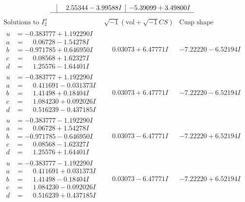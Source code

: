 \documentclass[1p]{elsarticle_modified}
\theoremstyle{definition}
\newcommand{\I}{\sqrt{-1}}
\begin{document}
$$\begin{array}{c|c|c}
 & \phantom{-}2.55344 - 3.99588 I & -5.39099 + 3.49800 I\\
 \hline 
 \end{array}$$\newpage$$\begin{array}{c|c|c}  
\text{Solutions to }I^u_{2}& \I (\text{vol} + \sqrt{-1}CS) & \text{Cusp shape}\\
 \hline 
\begin{aligned}
u &= -0.383777 + 1.192290 I \\
a &= \phantom{-}0.06728 - 1.54278 I \\
b &= -0.971785 + 0.646950 I \\
c &= \phantom{-}0.08568 + 1.62327 I \\
d &= \phantom{-}1.25576 - 1.64401 I\end{aligned}
 & \phantom{-}0.03073 + 6.47771 I & -7.22220 - 6.52194 I \\ \hline\begin{aligned}
u &= -0.383777 + 1.192290 I \\
a &= \phantom{-}0.411691 - 0.031373 I \\
b &= \phantom{-}1.41498 + 0.18404 I \\
c &= \phantom{-}1.084230 + 0.092026 I \\
d &= \phantom{-}0.516239 - 0.437185 I\end{aligned}
 & \phantom{-}0.03073 + 6.47771 I & -7.22220 - 6.52194 I \\ \hline\begin{aligned}
u &= -0.383777 - 1.192290 I \\
a &= \phantom{-}0.06728 + 1.54278 I \\
b &= -0.971785 - 0.646950 I \\
c &= \phantom{-}0.08568 - 1.62327 I \\
d &= \phantom{-}1.25576 + 1.64401 I\end{aligned}
 & \phantom{-}0.03073 - 6.47771 I & -7.22220 + 6.52194 I \\ \hline\begin{aligned}
u &= -0.383777 - 1.192290 I \\
a &= \phantom{-}0.411691 + 0.031373 I \\
b &= \phantom{-}1.41498 - 0.18404 I \\
c &= \phantom{-}1.084230 - 0.092026 I \\
d &= \phantom{-}0.516239 + 0.437185 I\end{aligned}
 & \phantom{-}0.03073 - 6.47771 I & -7.22220 + 6.52194 I \\ \hline\begin{aligned}

\end{aligned}
\end{array}$$
\end{document}
